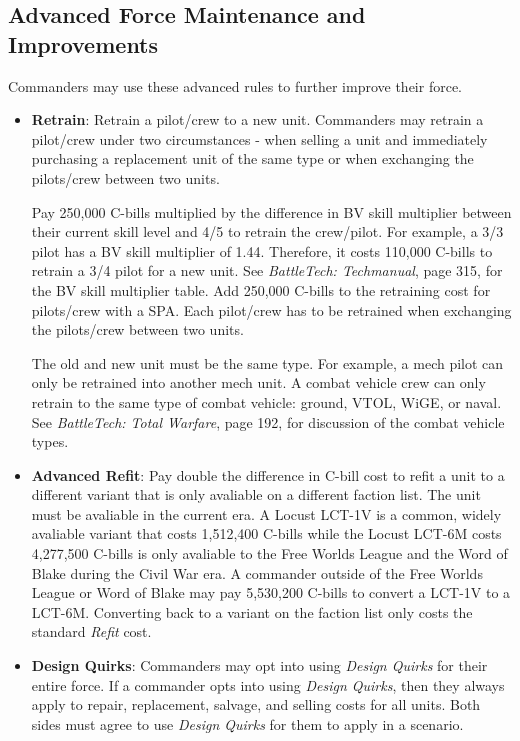 \documentclass{article}
\begin{document}
\newpage

\subsection{Advanced Force Maintenance and Improvements}

Commanders may use these advanced rules to further improve their force.

\begin{itemize}

\item {\bf Retrain}: Retrain a pilot/crew to a new unit.
Commanders may retrain a pilot/crew under two circumstances - when selling a unit and immediately purchasing a replacement unit of the same type or when exchanging the pilots/crew between two units.

Pay 250,000 C-bills multiplied by the difference in BV skill multiplier between their current skill level and 4/5 to retrain the crew/pilot.
For example, a 3/3 pilot has a BV skill multiplier of 1.44.
Therefore, it costs 110,000 C-bills to retrain a 3/4 pilot for a new unit.
See \emph{BattleTech: Techmanual}, page 315, for the BV skill multiplier table.
Add 250,000 C-bills to the retraining cost for pilots/crew with a SPA.
Each pilot/crew has to be retrained when exchanging the pilots/crew between two units.

The old and new unit must be the same type.
For example, a mech pilot can only be retrained into another mech unit.
A combat vehicle crew can only retrain to the same type of combat vehicle: ground, VTOL, WiGE, or naval.
See \emph{BattleTech: Total Warfare}, page 192, for discussion of the combat vehicle types.

\item {\bf Advanced Refit}: Pay double the difference in C-bill cost to refit a unit to a different variant that is only avaliable on a different faction list.
The unit must be avaliable in the current era.
A Locust LCT-1V is a common, widely avaliable variant that costs 1,512,400 C-bills while the Locust LCT-6M costs 4,277,500 C-bills is only avaliable to the Free Worlds League and the Word of Blake during the Civil War era.
A commander outside of the Free Worlds League or Word of Blake may pay 5,530,200 C-bills to convert a LCT-1V to a LCT-6M.
Converting back to a variant on the faction list only costs the standard \emph{Refit} cost.

\item {\bf Design Quirks}: Commanders may opt into using \emph{Design Quirks} for their entire force.
If a commander opts into using \emph{Design Quirks}, then they always apply to repair, replacement, salvage, and selling costs for all units.
Both sides must agree to use \emph{Design Quirks} for them to apply in a scenario.


\end{itemize}
\end{document}
